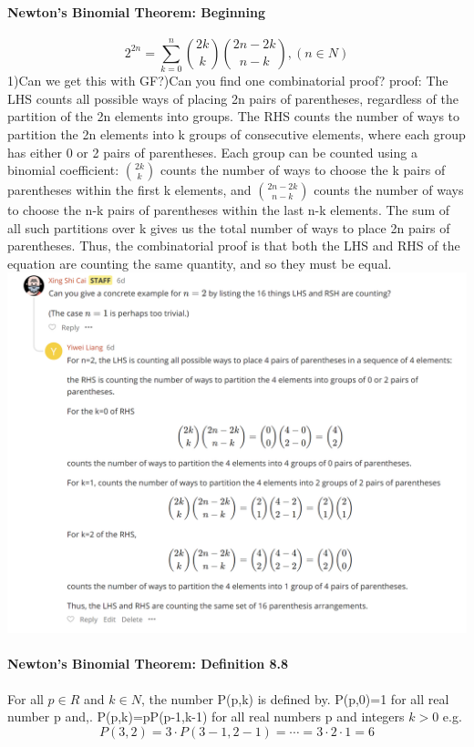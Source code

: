 \documentclass{article}
\begin{document}
\paragraph{Newton's Binomial Theorem: Beginning}
$$2^{2n}=\sum_{k=0}^{n}\binom{2k}{k}\binom{2n-2k}{n-k},(n\in N)$$
1)Can we get this with GF?)Can you find one combinatorial proof?\newline
proof:\newline
The LHS counts all possible ways of placing 2n pairs of parentheses, regardless of the partition of the 2n elements into groups.
\newline
The RHS counts the number of ways to partition the 2n elements into k groups of consecutive elements, where each group has either 0 or 2 pairs of parentheses. Each group can be counted using a binomial coefficient: $\binom{2k}{k}$ counts the number of ways to choose the k pairs of parentheses within the first k elements, and $\binom{2n-2k}{n-k}$ counts the number of ways to choose the n-k pairs of parentheses within the last n-k elements. The sum of all such partitions over k gives us the total number of ways to place 2n pairs of parentheses.
\newline
Thus, the combinatorial proof is that both the LHS and RHS of the equation are counting the same quantity, and so they must be equal.\newline
\includegraphics{0023}
\paragraph{Newton's Binomial Theorem: Definition 8.8}
For all $p\in R$ and $k\in N$, the number P(p,k) is defined by. P(p,0)=1 for all real number p and,. P(p,k)=pP(p-1,k-1) for all real numbers p and integers $k>0$\newline
e.g.\newline
$$P(3,2)=3\cdot P(3-1,2-1)=\cdots=3\cdot 2\cdot 1 =6$$
\end{document}
